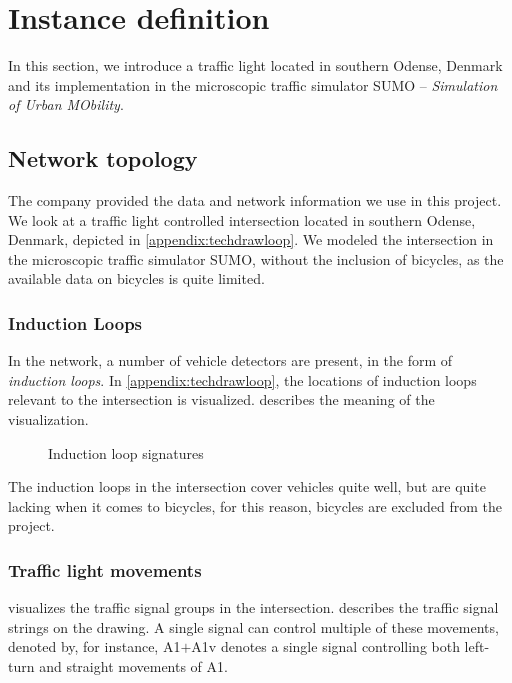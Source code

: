 \section{Instance definition}
In this section, we introduce a traffic light located in southern Odense, Denmark and its implementation in the microscopic traffic simulator SUMO -- \textit{Simulation of Urban MObility}.

\subsection{Network topology}
The company \swarco{} provided the data and network information we use in this project. We look at a traffic light controlled intersection located in southern Odense, Denmark, depicted in \cref{appendix:techdrawloop}. We modeled the intersection in the microscopic traffic simulator SUMO, without the inclusion of bicycles, as the available data on bicycles is quite limited.

\subsubsection{Induction Loops}
In the network, a number of vehicle detectors are present, in the form of \textit{induction loops}.
In \cref{appendix:techdrawloop}, the locations of induction loops relevant to the intersection is visualized.  describes the meaning of the visualization.

\begin{figure}[!htb]
  \centering
  \caption{Induction loop signatures}
  \label{fig:inductionsignatures}
\end{figure}

The induction loops in the intersection cover vehicles quite well, but are quite lacking when it comes to bicycles, for this reason, bicycles are excluded from the project.


\subsubsection{Traffic light movements}
 visualizes the traffic signal groups in the intersection.  describes the traffic signal strings on the drawing. A single signal can control multiple of these movements, denoted by, for instance, A1$+$A1v denotes a single signal controlling both left-turn and straight movements of A1.


